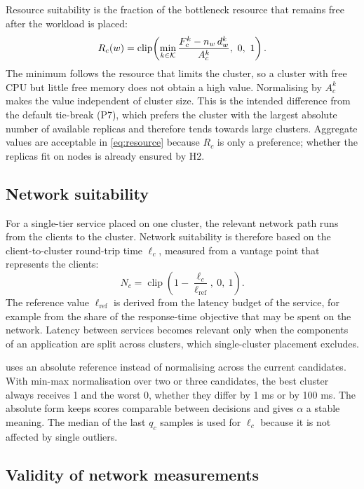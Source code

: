 Resource suitability is the fraction of the bottleneck resource that remains free after the workload is placed:
\begin{equation}\label{eq:resource}
  R_c(w) = \operatorname{clip}\!\left( \min_{k \in \mathcal{K}} \frac{F_c^{k} - n_w\, d_w^{k}}{A_c^{k}},\ 0,\ 1 \right).
\end{equation}
The minimum follows the resource that limits the cluster, so a cluster with free CPU but little free memory does not obtain a high value. Normalising by $A_c^k$ makes the value independent of cluster size. This is the intended difference from the default tie-break (P7), which prefers the cluster with the largest absolute number of available replicas and therefore tends towards large clusters. Aggregate values are acceptable in \cref{eq:resource} because $R_c$ is only a preference; whether the replicas fit on nodes is already ensured by H2.

\subsection{Network suitability}\label{sec:method-network}

For a single-tier service placed on one cluster, the relevant network path runs from the clients to the cluster. Network suitability is therefore based on the client-to-cluster round-trip time $\ell_c$, measured from a vantage point that represents the clients:
\begin{equation}\label{eq:network}
  N_c = \operatorname{clip}\!\left( 1 - \frac{\ell_c}{\ell_{\mathrm{ref}}},\ 0,\ 1 \right).
\end{equation}
The reference value $\ell_{\mathrm{ref}}$ is derived from the latency budget of the service, for example from the share of the response-time objective that may be spent on the network. Latency between services becomes relevant only when the components of an application are split across clusters, which single-cluster placement excludes.

 uses an absolute reference instead of normalising across the current candidates. With min-max normalisation over two or three candidates, the best cluster always receives 1 and the worst 0, whether they differ by 1 ms or by 100 ms. The absolute form keeps scores comparable between decisions and gives $\alpha$ a stable meaning. The median of the last $q_c$ samples is used for $\ell_c$ because it is not affected by single outliers.

\subsection{Validity of network measurements}\label{sec:method-validity}

